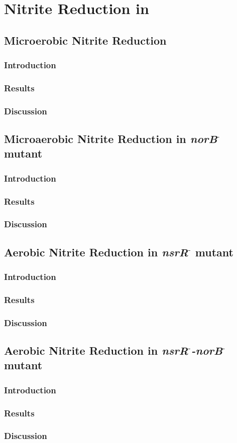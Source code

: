 \chapter{Nitrite Reduction in \Nm{}}
\section{Microerobic Nitrite Reduction}
\subsection{Introduction}
\subsection{Results}
\subsection{Discussion}
\section{Microaerobic Nitrite Reduction in \textit{norB$^\textrm{-}$} mutant}
\subsection{Introduction}
\subsection{Results}
\subsection{Discussion}
\section{Aerobic Nitrite Reduction in \textit{nsrR$^\textrm{-}$} mutant}
\subsection{Introduction}
\subsection{Results}
\subsection{Discussion}
\section{Aerobic Nitrite Reduction in \textit{nsrR$^\textrm{-}$-norB$^\textrm{-}$} mutant}
\subsection{Introduction}
\subsection{Results}
\subsection{Discussion}